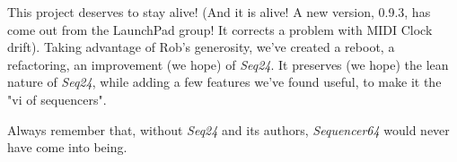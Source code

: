    This project deserves to stay alive!
   (And it is alive!  A new version, 0.9.3, has come out from the LaunchPad
   group!  It corrects a problem with MIDI Clock drift).
   Taking advantage of Rob's generosity,
   we've created a reboot, a refactoring, an improvement (we hope) of
   \textsl{Seq24}.  It preserves (we hope) the lean nature of \textsl{Seq24},
   while adding a few features we've found useful, to make it the
    "vi of sequencers".
   
   Always remember that, without \textsl{Seq24} and its authors,
   \textsl{Sequencer64} would never have come into being.

